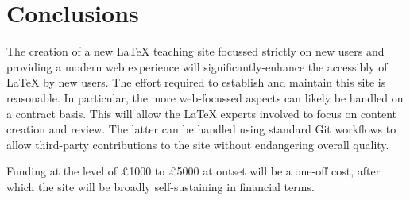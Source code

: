 \documentclass{article}
\begin{document}
\section{Conclusions}

The creation of a new \LaTeX{} teaching site focussed strictly on new users and
providing a modern web experience will significantly-enhance the accessibly of
\LaTeX{} by new users. The effort required to establish and maintain this site
is reasonable. In particular, the more web-focussed aspects can likely be
handled on a contract basis. This will allow the \LaTeX{} experts involved to
focus on content creation and review. The latter can be handled using standard
Git workflows to allow third-party contributions
to the site without endangering overall quality.

Funding at the level of \pounds 1000 to \pounds 5000 at outset will be a
one-off cost, after which the site will be broadly self-sustaining in
financial terms.
\end{document}
